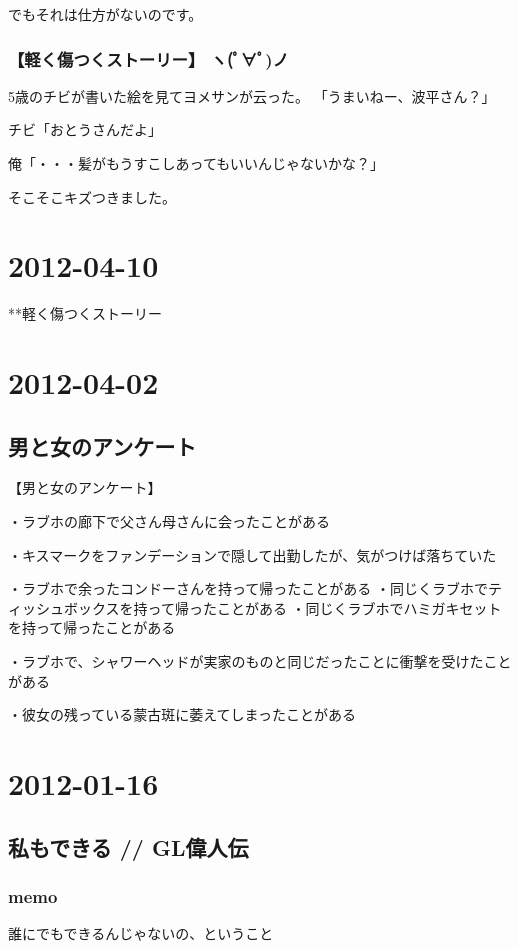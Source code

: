 \documentclass[11pt]{article}
\begin{document}
でもそれは仕方がないのです。
\subsubsection{【軽く傷つくストーリー】 ヽ(ﾟ∀ﾟ)ノ}
\label{sec-10_1}


5歳のチビが書いた絵を見てヨメサンが云った。
「うまいねー、波平さん？」

チビ「おとうさんだよ」

俺「・・・髪がもうすこしあってもいいんじゃないかな？」

そこそこキズつきました。
\section{2012-04-10}
\label{sec-10}

**軽く傷つくストーリー
\section{2012-04-02}
\label{sec-11}
\subsection{男と女のアンケート}
\label{sec-11_1}

【男と女のアンケート】

・ラブホの廊下で父さん母さんに会ったことがある

・キスマークをファンデーションで隠して出勤したが、気がつけば落ちていた

・ラブホで余ったコンドーさんを持って帰ったことがある
・同じくラブホでティッシュボックスを持って帰ったことがある
・同じくラブホでハミガキセットを持って帰ったことがある

・ラブホで、シャワーヘッドが実家のものと同じだったことに衝撃を受けたことがある

・彼女の残っている蒙古斑に萎えてしまったことがある
\section{2012-01-16}
\label{sec-12}
\subsection{私もできる // GL偉人伝}
\label{sec-12_1}
\subsubsection{memo}
\label{sec-12_1_1}

誰にでもできるんじゃないの、ということ
\end{document}
